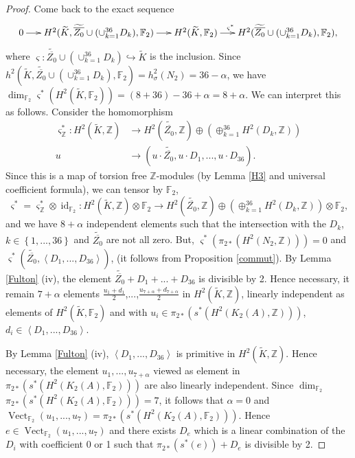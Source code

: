 \documentclass{alggeom}
\DeclareMathOperator{\id}{id}
\DeclareMathOperator{\Vect}{Vect}
\newcommand{\Z}{\mathbb{Z}}
\theoremstyle{plain}
\theoremstyle{definition}
\theoremstyle{remark}
\begin{document}
\begin{proof}
Come back to the exact sequence
$$\xymatrix@C=15pt{0\ar[r] &H^{2}(\widetilde{K},\widetilde{\overline{Z_{0}}}\cup(\cup_{k=1}^{36}D_{k}),\mathbb{F}_{2})\ar[r]&\ar[r]^{\varsigma^{*}\ \ \ \ \ \ \  }H^{2}(\widetilde{K},\mathbb{F}_{2}) & H^{2}(\widetilde{\overline{Z_{0}}}\cup(\cup_{k=1}^{36}D_{k}),\mathbb{F}_{2}),
}$$
where $\varsigma:\widetilde{\overline{Z_{0}}}\cup(\cup_{k=1}^{36}D_{k})\hookrightarrow \widetilde{K}$ is the inclusion.
Since $h^{2}(\widetilde{K},\widetilde{\overline{Z_{0}}}\cup(\cup_{k=1}^{36}D_{k}),\mathbb{F}_{2})=h^{2}_{\sigma}(N_{2})=36-\alpha$, we have $\dim_{\mathbb{F}_{2}} \varsigma^{*}(H^{2}(\widetilde{K},\mathbb{F}_{2}))=(8+36)-36+\alpha=8+\alpha$.
We can interpret this as follows.
Consider the homomorphism
\begin{align*}
\varsigma^{*}_{\Z}:H^{2}(\widetilde{K},\Z)&\rightarrow H^{2}(\widetilde{\overline{Z_{0}}},\Z)\oplus (\oplus_{k=1}^{36} H^{2}(D_{k},\Z))\\
 u&\rightarrow (u\cdot\widetilde{\overline{Z_{0}}},u\cdot D_{1},...,u\cdot D_{36}).
\end{align*}
Since this is a map of torsion free $\Z$-modules (by Lemma \ref{H3} and universal coefficient formula), we can tensor by $\mathbb{F}_{2}$,
$$\varsigma^{*}=\varsigma^{*}_{\Z}\otimes \id_{\mathbb{F}_{2}}: H^{2}(\widetilde{K},\Z)\otimes\mathbb{F}_{2}\rightarrow H^{2}(\widetilde{\overline{Z_{0}}},\Z)\oplus (\oplus_{k=1}^{36} H^{2}(D_{k},\Z))\otimes\mathbb{F}_{2},$$
and we have $8+\alpha$ independent elements such that the intersection with the $D_{k}$, $k\in\left\{1,...,36\right\}$ and $\widetilde{\overline{Z_{0}}}$ are not all zero.
But, $\varsigma^{*}(\pi_{2*}(H^{2}(N_2,\Z)))=0$ and $\varsigma^{*}(\widetilde{\overline{Z_0}},\left\langle D_1,...,D_{36}\right\rangle)$, (it follows from Proposition \ref{commut}). By Lemma \ref{Fulton} (iv), the element $\widetilde{\overline{Z_0}}+D_{1}+...+D_{36}$ is divisible by 2. 
Hence necessary, it remain $7+\alpha$ elements $\frac{u_1+d_1}{2}$,...,$\frac{u_{7+\alpha}+d_{7+\alpha}}{2}$ in 
$H^2(\widetilde{K},\Z)$, linearly independent as elements of $H^2(\widetilde{K},\mathbb{F}_2)$ and with $u_i\in \pi_{2*}(s^{*}(H^{2}(K_{2}(A),\Z)))$, $d_i\in\left\langle D_1,...,D_{36}\right\rangle$.

By Lemma \ref{Fulton} (iv), $\left\langle D_1,...,D_{36}\right\rangle$ is primitive in $H^2(\widetilde{K},\Z)$. Hence necessary, the element $u_1,...,u_{7+\alpha}$ viewed as element in $\pi_{2*}(s^{*}(H^{2}(K_{2}(A),\mathbb{F}_{2})))$ are also linearly independent. 
Since $\dim_{\mathbb{F}_{2}}$ $\pi_{2*}(s^{*}(H^{2}(K_{2}(A),\mathbb{F}_{2})))=7$, it follows that $\alpha=0$ and $\Vect_{\mathbb{F}_{2}}(u_1,...,u_{7})=\pi_{2*}(s^{*}(H^{2}(K_{2}(A),\mathbb{F}_{2})))$.
Hence $e\in\Vect_{\mathbb{F}_{2}}(u_1,...,u_{7})$ and there exists $D_e$ which is a linear combination of the $D_i$ with coefficient 0 or 1 such that $\pi_{2*}(s^{*}(e))+D_e$ is divisible by 2.
\end{proof}
\end{document}
